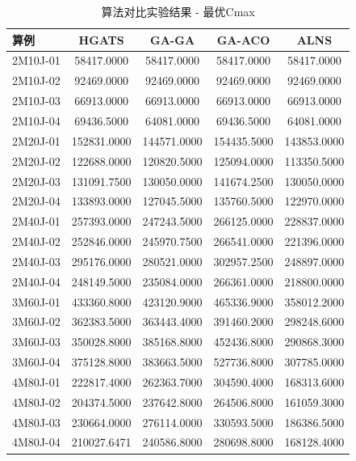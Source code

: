 \begin{table}[htbp]
\centering
\caption{算法对比实验结果 - 最优Cmax}
\begin{tabular}{l|cccc}
\hline
算例 & HGATS & GA-GA & GA-ACO & ALNS \\
\hline
2M10J-01 & 58417.0000 & 58417.0000 & 58417.0000 & 58417.0000 \\
2M10J-02 & 92469.0000 & 92469.0000 & 92469.0000 & 92469.0000 \\
2M10J-03 & 66913.0000 & 66913.0000 & 66913.0000 & 66913.0000 \\
2M10J-04 & 69436.5000 & 64081.0000 & 69436.5000 & 64081.0000 \\
2M20J-01 & 152831.0000 & 144571.0000 & 154435.5000 & 143853.0000 \\
2M20J-02 & 122688.0000 & 120820.5000 & 125094.0000 & 113350.5000 \\
2M20J-03 & 131091.7500 & 130050.0000 & 141674.2500 & 130050.0000 \\
2M20J-04 & 133893.0000 & 127045.5000 & 135760.5000 & 122970.0000 \\
2M40J-01 & 257393.0000 & 247243.5000 & 266125.0000 & 228837.0000 \\
2M40J-02 & 252846.0000 & 245970.7500 & 266541.0000 & 221396.0000 \\
2M40J-03 & 295176.0000 & 280521.0000 & 302957.2500 & 248897.0000 \\
2M40J-04 & 248149.5000 & 235084.0000 & 266361.0000 & 218800.0000 \\
3M60J-01 & 433360.8000 & 423120.9000 & 465336.9000 & 358012.2000 \\
3M60J-02 & 362383.5000 & 363443.4000 & 391460.2000 & 298248.6000 \\
3M60J-03 & 350028.8000 & 385168.8000 & 452436.8000 & 290868.3000 \\
3M60J-04 & 375128.8000 & 383663.5000 & 527736.8000 & 307785.0000 \\
4M80J-01 & 222817.4000 & 262363.7000 & 304590.4000 & 168313.6000 \\
4M80J-02 & 204374.5000 & 237642.8000 & 264506.8000 & 161059.3000 \\
4M80J-03 & 230664.0000 & 276114.0000 & 330593.5000 & 186386.5000 \\
4M80J-04 & 210027.6471 & 240586.8000 & 280698.8000 & 168128.4000 \\
\hline
\end{tabular}
\end{table}
